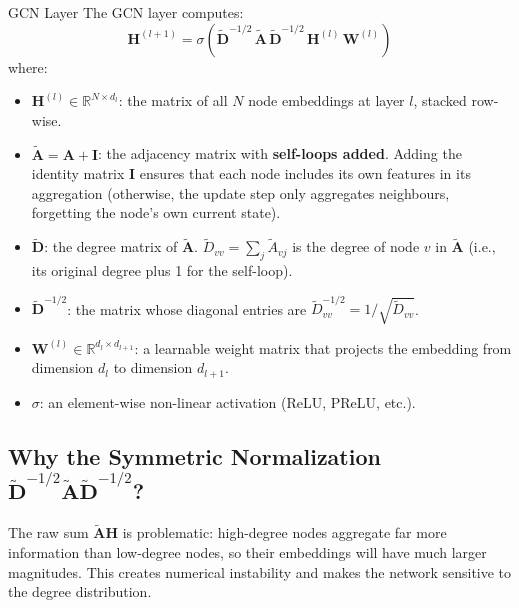 \begin{mathbox}{GCN Layer}
The GCN layer computes:
\begin{equation}
    \mathbf{H}^{(l+1)} = \sigma\!\left(\tilde{\mathbf{D}}^{-1/2}\, \tilde{\mathbf{A}}\, \tilde{\mathbf{D}}^{-1/2}\, \mathbf{H}^{(l)}\, \mathbf{W}^{(l)}\right)
    \label{eq:gcn}
\end{equation}
where:
\begin{itemize}[noitemsep]
    \item $\mathbf{H}^{(l)} \in \mathbb{R}^{N \times d_l}$: the matrix of all $N$ node embeddings at layer $l$, stacked row-wise.
    \item $\tilde{\mathbf{A}} = \mathbf{A} + \mathbf{I}$: the adjacency matrix with \textbf{self-loops added}. Adding the identity matrix $\mathbf{I}$ ensures that each node includes its own features in its aggregation (otherwise, the update step only aggregates neighbours, forgetting the node's own current state).
    \item $\tilde{\mathbf{D}}$: the degree matrix of $\tilde{\mathbf{A}}$. $\tilde{D}_{vv} = \sum_j \tilde{A}_{vj}$ is the degree of node $v$ in $\tilde{\mathbf{A}}$ (i.e., its original degree plus 1 for the self-loop).
    \item $\tilde{\mathbf{D}}^{-1/2}$: the matrix whose diagonal entries are $\tilde{D}_{vv}^{-1/2} = 1/\sqrt{\tilde{D}_{vv}}$.
    \item $\mathbf{W}^{(l)} \in \mathbb{R}^{d_l \times d_{l+1}}$: a learnable weight matrix that projects the embedding from dimension $d_l$ to dimension $d_{l+1}$.
    \item $\sigma$: an element-wise non-linear activation (ReLU, PReLU, etc.).
\end{itemize}
\end{mathbox}

\subsection{Why the Symmetric Normalization $\tilde{\mathbf{D}}^{-1/2} \tilde{\mathbf{A}} \tilde{\mathbf{D}}^{-1/2}$?}

The raw sum $\tilde{\mathbf{A}} \mathbf{H}$ is problematic: high-degree nodes aggregate far more information than low-degree nodes, so their embeddings will have much larger magnitudes. This creates numerical instability and makes the network sensitive to the degree distribution.

